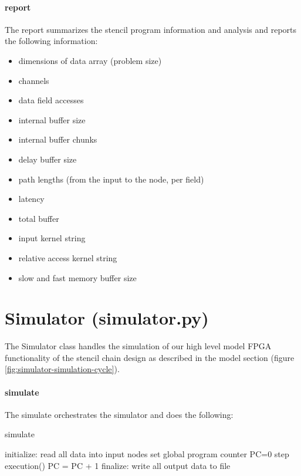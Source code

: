 \paragraph{report}
The report summarizes the stencil program information and analysis and reports the following information:
\begin{itemize}
	\item dimensions of data array (problem size)
	\item channels
	\item data field accesses
	\item internal buffer size
	\item internal buffer chunks
	\item delay buffer size
	\item path lengths (from the input to the node, per field)
	\item latency
	\item total buffer 
	\item input kernel string
	\item relative access kernel string
	\item slow and fast memory buffer size
\end{itemize}







\section{Simulator (simulator.py)}
The Simulator class handles the simulation of our high level model FPGA functionality of the stencil chain design as described in the model section (figure \ref{fig:simulator-simulation-cycle}). \\


\paragraph{simulate}
The simulate orchestrates the simulator and does the following:
\begin{algorithm}
	\caption{simulate}
	\begin{algorithmic}
		\STATE initialize: read all data into input nodes
		\STATE set global program counter PC=0
		\STATE step execution()
		\STATE PC = PC + 1
		\ENDWHILE
		\STATE finalize: write all output data to file
	\end{algorithmic}
\end{algorithm}

